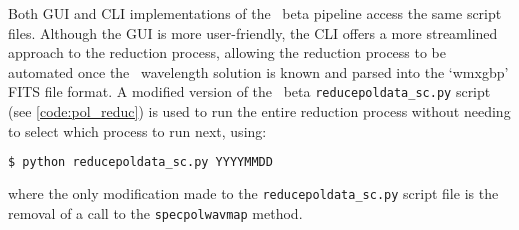 Both \gls{GUI} and \gls{CLI} implementations of the \polsalt\ beta pipeline access the same script files. Although the \gls{GUI} is more user-friendly, the \gls{CLI} offers a more streamlined approach to the reduction process, allowing the reduction process to be automated once the \iraf\ wavelength solution is known and parsed into the `wmxgbp' \gls{FITS} file format. A modified version of the \polsalt\ beta \texttt{reducepoldata\_sc.py} script (see \autoref{code:pol_reduc}) is used to run the entire reduction process without needing to select which process to run next, using:
\begin{lstlisting}[language=bash]
$ python reducepoldata_sc.py YYYYMMDD
\end{lstlisting}
{\parskip=0pt where} the only modification made to the \texttt{reducepoldata\_sc.py} script file is the removal of a call to the \texttt{specpolwavmap} method.

\pagebreak


